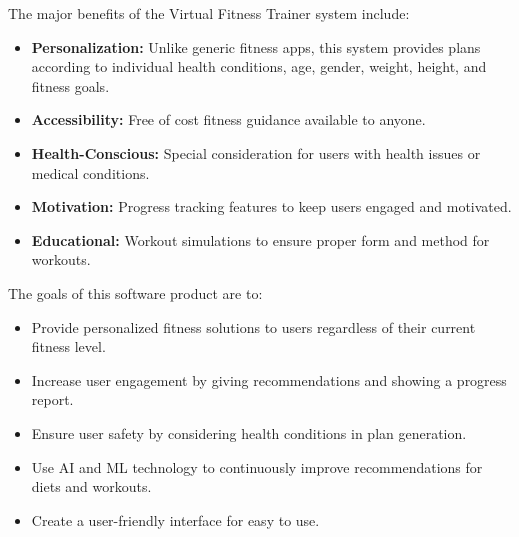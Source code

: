 \documentclass[12pt,a4paper]{article}
\begin{document}
The major benefits of the Virtual Fitness Trainer system include:

\begin{itemize}
    \item \textbf{Personalization:} Unlike generic fitness apps, this system provides plans according to individual health conditions, age, gender, weight, height, and fitness goals.
    \item \textbf{Accessibility:} Free of cost fitness guidance available to anyone.
    \item \textbf{Health-Conscious:} Special consideration for users with health issues or medical conditions.
    \item \textbf{Motivation:} Progress tracking features to keep users engaged and motivated.
    \item \textbf{Educational:} Workout simulations to ensure proper form and method for workouts.
\end{itemize}

The goals of this software product are to:
\begin{itemize}
    \item Provide personalized fitness solutions to users regardless of their current fitness level.
    \item Increase user engagement by giving recommendations and showing a progress report.
    \item Ensure user safety by considering health conditions in plan generation.
    \item Use AI and ML technology to continuously improve recommendations for diets and workouts.
    \item Create a user-friendly interface for easy to use.
\end{itemize}
\end{document}
